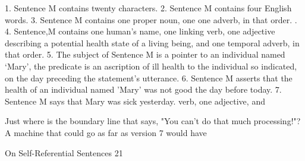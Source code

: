    1. Sentence M contains twenty characters.
   2. Sentence M contains four English words.
   3. Sentence M contains one proper noun, one one adverb, in that order. .
   4. Sentence,M contains one human's name, one linking verb, one adjective describing
       a potential health state of a living being, and one temporal adverb, in that order.
   5. The subject of Sentence M is a pointer to an individual named `Mary', the predicate
       is an ascription of ill health to the individual so indicated, on the day preceding the
       statement's utterance.
   6. Sentence M asserts that the health of an individual named 'Mary' was not good the
       day before today.
   7. Sentence M says that Mary was sick yesterday. verb, one adjective, and

      Just where is the boundary line that says, "You can't do that much processing!"?
A machine that could go as far as version 7 would have




On Self-Referential Sentences                                                               21

